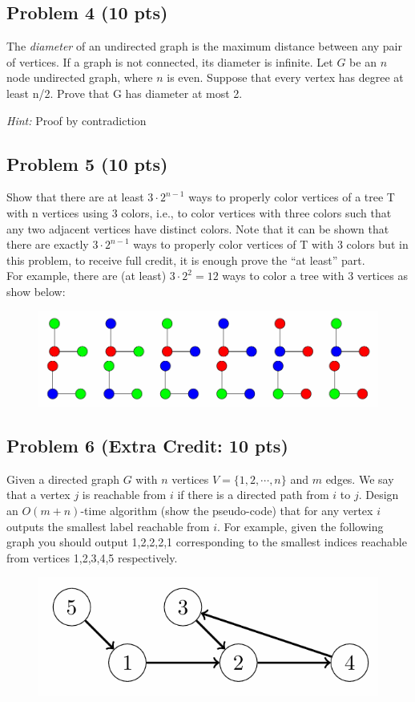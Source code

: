 \documentclass[12pt]{article}
\begin{document}
\subsection*{Problem 4 (10 pts)}
The \textit{diameter} of an undirected graph is the maximum distance between any pair of vertices. If a graph is not connected, its diameter is infinite. Let $G$ be an $n$ node undirected graph, where $n$ is even. Suppose that every vertex has degree at least n/2. Prove that G has diameter at most 2.

\textit{Hint:} Proof by contradiction

\subsection*{Problem 5 (10 pts)}
Show that there are at least $3\cdot2^{n-1}$ ways to properly color vertices of a tree T with n vertices using 3 colors, i.e., to color vertices with three colors such that any two adjacent vertices have  distinct colors. Note that it can be shown that there are exactly $3\cdot2^{n-1}$ ways to properly color vertices of T with 3 colors but in this problem, to receive full credit, it is enough prove the “at least” part.\\
For example, there are (at least) $3\cdot2^2 = 12$ ways to color a tree with 3 vertices as show below:

\begin{figure}[H]
    \centering
    \includegraphics[width=0.8\linewidth]{P5.png}
    \label{fig:3-color-graph}
\end{figure}

\subsection*{Problem 6 (Extra Credit: 10 pts)}
Given a directed graph $G$ with $n$ vertices $V = \{1,2,\cdots,n\}$ and $m$ edges. We say that a vertex $j$ is reachable from $i$ if there is a directed path from $i$ to $j$. Design an $O(m+n)$-time algorithm (show the pseudo-code) that for any vertex $i$ outputs the smallest label reachable from $i$. For example, given the following graph you should output 1,2,2,2,1 corresponding to the smallest indices reachable from vertices 1,2,3,4,5 respectively.
\begin{figure}[H]
    \centering
    \includegraphics[width=0.5\linewidth]{P6.png}
    \label{fig:P6}
\end{figure}
\end{document}
